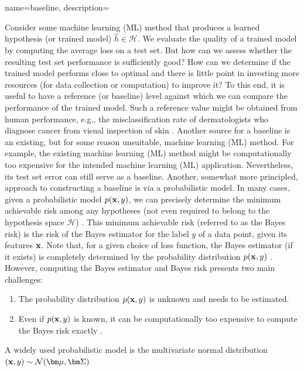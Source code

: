 {name={baseline},
    description={Consider some machine learning (ML) method that produces a learned 
    	hypothesis (or trained model) $\hat{h} \in \mathcal{H}$. We evaluate the quality of a trained model 
    by computing the average loss on a test set. But how can we assess 
    whether the resulting test set performance is sufficiently good? How can we 
    determine if the trained model performs close to optimal and there is little point 
    in investing more resources (for data collection or computation) to improve it? 
    To this end, it is useful to have a reference (or baseline) level against which 
    we can compare the performance of the trained model. Such a reference value 
    might be obtained from human performance, e.g., the misclassification rate of dermatologists 
    who diagnose cancer from visual inspection of skin \cite{SkinHumanAI}. Another source for a baseline is an existing, 
    but for some reason unsuitable, machine learning (ML) method. For example, the existing machine learning (ML) method 
    might be computationally too expensive for the intended machine learning (ML) application. 
    Nevertheless, its test set error can still serve as a baseline. Another, somewhat more principled, 
    approach to constructing a baseline is via a probabilistic model. In many cases, given a probabilistic model $p({\bf x},y)$,  
    we can precisely determine the minimum achievable risk among any hypotheses
    (not even required to belong to the hypothesis space $\mathcal{H}$) \cite{LC}. 
    This minimum achievable risk (referred to as the Bayes risk) is the risk 
    of the Bayes estimator for the label $y$ of a data point, given
    its features ${\bf x}$. Note that, for a given choice of loss function, the 
    Bayes estimator (if it exists) is completely determined by the probability distribution $p({\bf x},y)$ \cite[Ch. 4]{LC}. 
    However, computing the Bayes estimator and Bayes risk presents two 
    main challenges:
    \begin{enumerate}[label=\arabic*)]
    	\item The probability distribution $p({\bf x},y)$ is unknown and 
    needs to be estimated.
    	\item Even if $p({\bf x},y)$ is known, 
    it can be computationally too expensive to compute the Bayes risk exactly \cite{cooper1990computational}. 
   \end{enumerate}
A widely used probabilistic model is the multivariate normal distribution $\left( {\bf x},y \right) \sim \mathcal{N}({\bm \mu},{\bm \Sigma})$ 
}}
